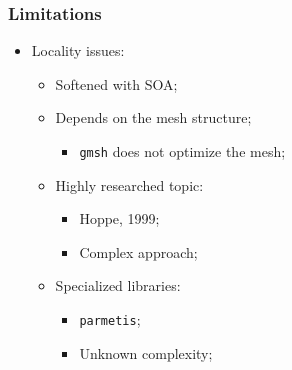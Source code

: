 \begin{frame}
	\frametitle{Limitations}
	\begin{itemize}
		\vfill
		\item Locality issues:
		\vfill
		\begin{itemize}
			\item Softened with SOA;
			\vfill
			\item Depends on the mesh structure;
			\begin{itemize}
				\item \texttt{gmsh} does not optimize the mesh;
			\end{itemize}
			\vfill
			\item Highly researched topic:
			\begin{itemize}
				\item Hoppe, 1999;
				\item Complex approach;
			\end{itemize}
			\vfill
			\item Specialized libraries:
			\begin{itemize}
				\item \texttt{parmetis};
				\item Unknown complexity;
			\end{itemize}
		\end{itemize}
	\end{itemize}
\end{frame}